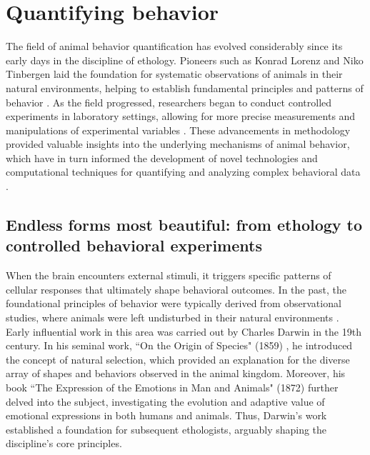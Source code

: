 \section{Quantifying behavior}

The field of animal behavior quantification has evolved considerably since its early days in the discipline of ethology. Pioneers such as Konrad Lorenz and Niko Tinbergen laid the foundation for systematic observations of animals in their natural environments, helping to establish fundamental principles and patterns of behavior \cite{Burkhardt2022Commentary:Ethology}. As the field progressed, researchers began to conduct controlled experiments in laboratory settings, allowing for more precise measurements and manipulations of experimental variables \cite{Scott1967ComparativeEthology}. These advancements in methodology provided valuable insights into the underlying mechanisms of animal behavior, which have in turn informed the development of novel technologies and computational techniques for quantifying and analyzing complex behavioral data \cite{Mathis2020APerspectives}.

\subsection{Endless forms most beautiful: from ethology to controlled behavioral experiments}

When the brain encounters external stimuli, it triggers specific patterns of cellular responses that ultimately shape behavioral outcomes. In the past, the foundational principles of behavior were typically derived from observational studies, where animals were left undisturbed in their natural environments \cite{Burkhardt2022Commentary:Ethology}. Early influential work in this area was carried out by Charles Darwin in the 19th century.
In his seminal work, ``On the Origin of Species" (1859) \cite{CharlesDarwin1859OnSpecies}, he introduced the concept of natural selection, which provided an explanation for the diverse array of shapes and behaviors observed in the animal kingdom. Moreover, his book ``The Expression of the Emotions in Man and Animals" (1872) \cite{CharlesDarwin1872TheAnimals} further delved into the subject, investigating the evolution and adaptive value of emotional expressions in both humans and animals. Thus, Darwin's work established a foundation for subsequent ethologists, arguably shaping the discipline's core principles. 

